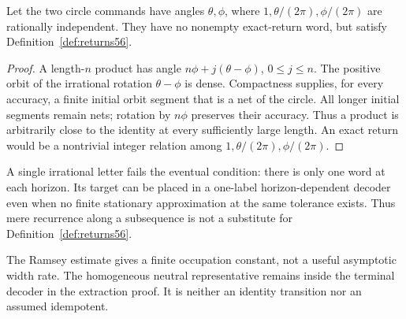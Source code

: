 \begin{proposition}\label{prop:approxreturns56}
Let the two circle commands have angles $\theta,\phi$, where $1,\theta/(2\pi),\phi/(2\pi)$ are rationally independent. They have no nonempty exact-return word, but satisfy Definition~\ref{def:returns56}.
\end{proposition}
\begin{proof}
A length-$n$ product has angle $n\phi+j(\theta-\phi)$, $0\le j\le n$. The positive orbit of the irrational rotation $\theta-\phi$ is dense. Compactness supplies, for every accuracy, a finite initial orbit segment that is a net of the circle. All longer initial segments remain nets; rotation by $n\phi$ preserves their accuracy. Thus a product is arbitrarily close to the identity at every sufficiently large length. An exact return would be a nontrivial integer relation among $1,\theta/(2\pi),\phi/(2\pi)$.
\end{proof}
A single irrational letter fails the eventual condition: there is only one word at each horizon. Its target can be placed in a one-label horizon-dependent decoder even when no finite stationary approximation at the same tolerance exists. Thus mere recurrence along a subsequence is not a substitute for Definition~\ref{def:returns56}.

\begin{remark}
The Ramsey estimate gives a finite occupation constant, not a useful
asymptotic width rate. The homogeneous neutral representative remains
inside the terminal decoder in the extraction proof. It is neither an
identity transition nor an assumed idempotent.
\end{remark}
